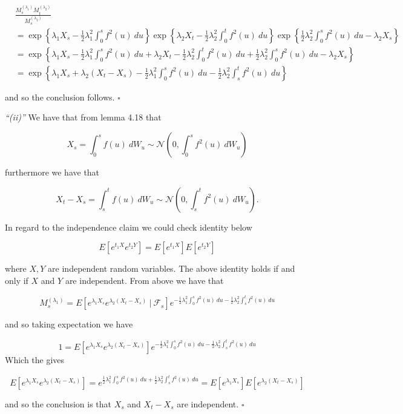 \documentclass[
]{book}
\begin{document}
\begin{align*}
&\frac{M^{(\lambda_1)}_sM^{(\lambda_2)}_t}{M^{(\lambda_2)}_s}\\
&=\exp\left\{\lambda_1 X_s-\frac{1}{2}\lambda_1^2\int_0^s f^2(u)\ du\right\}\exp\left\{\lambda_2 X_t-\frac{1}{2}\lambda_2^2\int_0^t f^2(u)\ du\right\}\exp\left\{\frac{1}{2}\lambda_2^2\int_0^s f^2(u)\ du-\lambda_2 X_s\right\}\\
&=\exp\left\{\lambda_1 X_s-\frac{1}{2}\lambda_1^2\int_0^s f^2(u)\ du+\lambda_2 X_t-\frac{1}{2}\lambda_2^2\int_0^t f^2(u)\ du+\frac{1}{2}\lambda_2^2\int_0^s f^2(u)\ du-\lambda_2 X_s\right\}\\
&=\exp\left\{\lambda_1 X_s+\lambda_2 (X_t-X_s)-\frac{1}{2}\lambda_1^2\int_0^s f^2(u)\ du-\frac{1}{2}\lambda_2^2\int_s^t f^2(u)\ du\right\}
\end{align*}

and so the conclusion follows. \(\square\)

\emph{``(ii)''} We have that from lemma 4.18 that

\[
X_s=\int_0^sf(u)\ dW_u\sim \mathcal{N}\left(0,\int_0^sf^2(u)\ dW_u\right)
\]

furthermore we have that

\[
X_t-X_s=\int_s^tf(u)\ dW_u\sim \mathcal{N}\left(0,\int_s^tf^2(u)\ dW_u\right).
\]

In regard to the independence claim we could check identity below

\[
E[e^{t_1X}e^{t_2 Y}]=E[e^{t_1X}]E[e^{t_2Y}]
\]

where \(X,Y\) are independent random variables. The above identity holds if and only if \(X\) and \(Y\) are independent. From above we have that

\[
M_s^{(\lambda_1)}=E[e^{\lambda_1X_s}e^{\lambda_2(X_t-X_s)}\ \vert\ \mathcal{F}_s]e^{-\frac{1}{2}\lambda_1^2\int_0^s f^2(u)\ du-\frac{1}{2}\lambda_2^2\int_s^t f^2(u)\ du}
\]

and so taking expectation we have

\[
1=E[e^{\lambda_1X_s}e^{\lambda_2(X_t-X_s)}]e^{-\frac{1}{2}\lambda_1^2\int_0^s f^2(u)\ du-\frac{1}{2}\lambda_2^2\int_s^t f^2(u)\ du}
\]
Which the gives

\[
E[e^{\lambda_1X_s}e^{\lambda_2(X_t-X_s)}]=e^{\frac{1}{2}\lambda_1^2\int_0^s f^2(u)\ du+\frac{1}{2}\lambda_2^2\int_s^t f^2(u)\ du}=E[e^{\lambda_1X_s}]E[e^{\lambda_2(X_t-X_s)}]
\]

and so the conclusion is that \(X_s\) and \(X_t-X_s\) are independent. \(\square\)

\noindent\makebox[\linewidth]{\rule{\textwidth}{0.4pt}}
\end{document}
